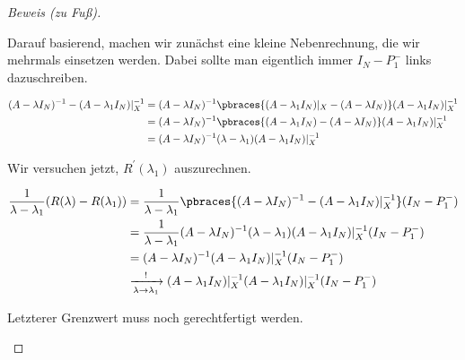 \begin{proof}[Beweis (zu Fuß)]
\begin{enumerate}[label = (\roman*)]
        Darauf basierend, machen wir zunächst eine kleine Nebenrechnung, die wir mehrmals einsetzen werden.
        Dabei sollte man eigentlich immer $I_N - P_1^-$ links dazuschreiben.

        \begin{align*}
            (A - \lambda I_N)^{-1}
            -
            (A - \lambda_1 I_N) |_X^{-1}
            & =
            (A - \lambda I_N)^{-1}
            \pbraces
            {
                (A - \lambda_1 I_N) |_X
                -
                (A - \lambda I_N)
            }
            (A - \lambda_1 I_N) |_X^{-1} \\
            & =
            (A - \lambda I_N)^{-1}
            \pbraces
            {
                (A - \lambda_1 I_N)
                -
                (A - \lambda I_N)
            }
            (A - \lambda_1 I_N) |_X^{-1} \\
            & =
            (A - \lambda I_N)^{-1}
            (\lambda - \lambda_1)
            (A - \lambda_1 I_N) |_X^{-1}
        \end{align*}

        Wir versuchen jetzt, $R^\prime(\lambda_1)$ auszurechnen.

        \begin{align*}
            \frac{1}{\lambda - \lambda_1}
            (R(\lambda) - R(\lambda_1))
            & =
            \frac{1}{\lambda - \lambda_1}
            \pbraces
            {
                (A - \lambda I_N)^{-1}
                -
                (A - \lambda_1 I_N) |_X^{-1}
            }
            (I_N - P_1^-) \\
            & =
            \frac{1}{\lambda - \lambda_1}
            (A - \lambda I_N)^{-1}
            (\lambda - \lambda_1)
            (A - \lambda_1 I_N) |_X^{-1}
            (I_N - P_1^-) \\
            & =
            (A - \lambda I_N)^{-1}
            (A - \lambda_1 I_N) |_X^{-1}
            (I_N - P_1^-) \\
            & \xrightarrow[\lambda \to \lambda_1]{!}
            (A - \lambda_1 I_N) |_X^{-1}
            (A - \lambda_1 I_N) |_X^{-1}
            (I_N - P_1^-)
        \end{align*}

        Letzterer Grenzwert muss noch gerechtfertigt werden.


\end{enumerate}
\end{proof}
